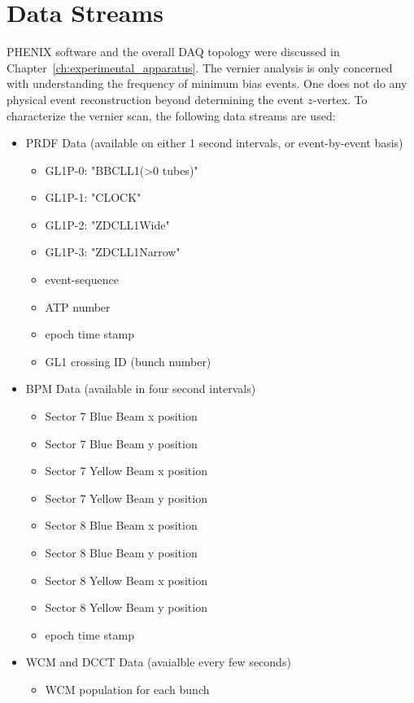 \clearpage
\section{Data Streams}
\label{ch:DataStreams}

PHENIX software and the overall DAQ topology were discussed in
Chapter~\ref{ch:experimental_apparatus}. The vernier analysis is only concerned
with understanding the frequency of minimum bias events. One does not do any
physical event reconstruction beyond determining the event $z$-vertex. To
characterize the vernier scan, the following data streams are used:

\begin{itemize}
\item PRDF Data (available on either 1 second intervals, or event-by-event basis)
  \begin{itemize}
  \item GL1P-0: "BBCLL1(\textgreater0 tubes)"
  \item GL1P-1: "CLOCK"
  \item GL1P-2: "ZDCLL1Wide"
  \item GL1P-3: "ZDCLL1Narrow"
  \item event-sequence
  \item ATP number
  \item epoch time stamp
  \item GL1 crossing ID (bunch number)
  \end{itemize}
\item BPM Data (available in four second intervals)
  \begin{itemize}
  \item Sector 7 Blue Beam x position
  \item Sector 7 Blue Beam y position
  \item Sector 7 Yellow Beam x position
  \item Sector 7 Yellow Beam y position
  \item Sector 8 Blue Beam x position
  \item Sector 8 Blue Beam y position
  \item Sector 8 Yellow Beam x position
  \item Sector 8 Yellow Beam y position
  \item epoch time stamp
  \end{itemize}
\item WCM and DCCT Data (avaialble every few seconds)
  \begin{itemize}
  \item WCM population for each bunch

\end{itemize}
\end{itemize}
